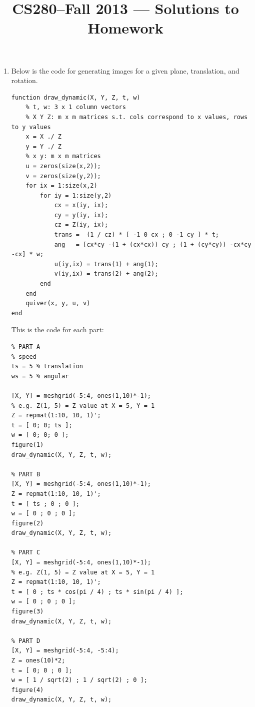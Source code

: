 \documentclass[11pt]{article}
\title{CS280--Fall 2013 --- Solutions to Homework \HWnum}
\author{\Name}
\begin{document}
\maketitle

\begin{enumerate}

\item 

Below is the code for generating images for a given plane, translation, and rotation.
\begin{verbatim}
function draw_dynamic(X, Y, Z, t, w)
    % t, w: 3 x 1 column vectors
    % X Y Z: m x m matrices s.t. cols correspond to x values, rows to y values
    x = X ./ Z
    y = Y ./ Z
    % x y: m x m matrices
    u = zeros(size(x,2));
    v = zeros(size(y,2));
    for ix = 1:size(x,2)
        for iy = 1:size(y,2)
            cx = x(iy, ix);
            cy = y(iy, ix);
            cz = Z(iy, ix);
            trans =  (1 / cz) * [ -1 0 cx ; 0 -1 cy ] * t;
            ang   = [cx*cy -(1 + (cx*cx)) cy ; (1 + (cy*cy)) -cx*cy -cx] * w;
            u(iy,ix) = trans(1) + ang(1);
            v(iy,ix) = trans(2) + ang(2);
        end
    end
    quiver(x, y, u, v)
end
\end{verbatim}

This is the code for each part:
\begin{verbatim}
% PART A
% speed
ts = 5 % translation
ws = 5 % angular

[X, Y] = meshgrid(-5:4, ones(1,10)*-1);
% e.g. Z(1, 5) = Z value at X = 5, Y = 1
Z = repmat(1:10, 10, 1)';
t = [ 0; 0; ts ];
w = [ 0; 0; 0 ];
figure(1)
draw_dynamic(X, Y, Z, t, w);

% PART B
[X, Y] = meshgrid(-5:4, ones(1,10)*-1);
Z = repmat(1:10, 10, 1)';
t = [ ts ; 0 ; 0 ];
w = [ 0 ; 0 ; 0 ];
figure(2)
draw_dynamic(X, Y, Z, t, w);

% PART C
[X, Y] = meshgrid(-5:4, ones(1,10)*-1);
% e.g. Z(1, 5) = Z value at X = 5, Y = 1
Z = repmat(1:10, 10, 1)';
t = [ 0 ; ts * cos(pi / 4) ; ts * sin(pi / 4) ];
w = [ 0 ; 0 ; 0 ];
figure(3)
draw_dynamic(X, Y, Z, t, w);

% PART D
[X, Y] = meshgrid(-5:4, -5:4);
Z = ones(10)*2;
t = [ 0; 0 ; 0 ];
w = [ 1 / sqrt(2) ; 1 / sqrt(2) ; 0 ];
figure(4)
draw_dynamic(X, Y, Z, t, w);
\end{verbatim}

\begin{enumerate}


\end{enumerate}
\end{enumerate}
\end{document}
